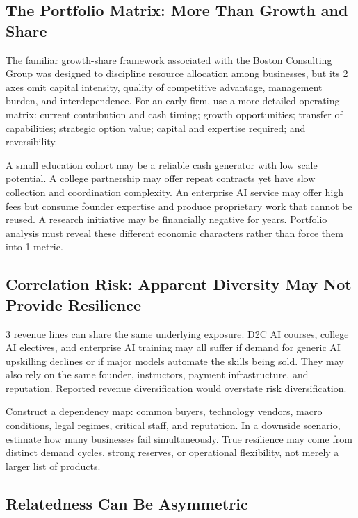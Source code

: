 \subsection{The Portfolio Matrix: More Than Growth and Share}
\label{sec:portfolio_matrix_beyond_bcg}

The familiar growth-share framework associated with the Boston Consulting Group was designed to discipline resource allocation among businesses, but its 2 axes omit capital intensity, quality of competitive advantage, management burden, and interdependence. For an early firm, use a more detailed operating matrix: current contribution and cash timing; growth opportunities; transfer of capabilities; strategic option value; capital and expertise required; and reversibility.

A small education cohort may be a reliable cash generator with low scale potential. A college partnership may offer repeat contracts yet have slow collection and coordination complexity. An enterprise AI service may offer high fees but consume founder expertise and produce proprietary work that cannot be reused. A research initiative may be financially negative for years. Portfolio analysis must reveal these different economic characters rather than force them into 1 metric.

\subsection{Correlation Risk: Apparent Diversity May Not Provide Resilience}
\label{sec:correlation_risk_apparent_diversity}

3 revenue lines can share the same underlying exposure. D2C AI courses, college AI electives, and enterprise AI training may all suffer if demand for generic AI upskilling declines or if major models automate the skills being sold. They may also rely on the same founder, instructors, payment infrastructure, and reputation. Reported revenue diversification would overstate risk diversification.

Construct a dependency map: common buyers, technology vendors, macro conditions, legal regimes, critical staff, and reputation. In a downside scenario, estimate how many businesses fail simultaneously. True resilience may come from distinct demand cycles, strong reserves, or operational flexibility, not merely a larger list of products.

\subsection{Relatedness Can Be Asymmetric}
\label{sec:relatedness_can_be_asymmetric}

